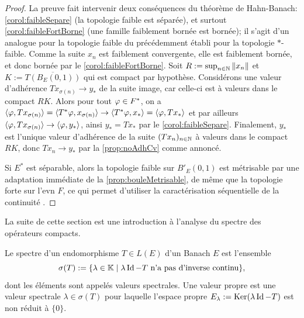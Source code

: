\begin{proof}
	La preuve fait intervenir deux conséquences du théorème de Hahn-Banach: \cref{corol:faibleSepare} (la topologie faible est séparée), et surtout \cref{corol:faibleFortBorne} (une famille faiblement bornée est bornée); 
	il s'agit d'un analogue pour la topologie faible du  précédemment établi pour la topologie $*$-faible.
	Comme la suite $x_n$ est faiblement convergente, elle est faiblement bornée, et donc bornée par le \cref{corol:faibleFortBorne}. %
	Soit $R := \sup_{n \in \mathbb{N}} \|x_n\|$ et $K := \overline {T(B_E(0,1))}$ qui est compact par hypothèse. Considérons une valeur d'adhérence $T x_{\sigma(n)} \to y_*$ de la suite image, car celle-ci est à valeurs dans le compact $R K$. 
	Alors pour tout $\varphi \in F^*$, on a $\langle\varphi, T x_{\sigma(n)}\rangle = \langle T^* \varphi, x_{\sigma(n)}\rangle \to \langle T^* \varphi, x_*\rangle = \langle\varphi, T x_*\rangle$ et par ailleurs $\langle\varphi, T x_{\sigma(n)}\rangle \to \langle \varphi, y_*\rangle$, ainsi $y_* = T x_*$ par le \cref{corol:faibleSepare}.
	Finalement, $y_*$ est l'unique valeur d'adhérence de la suite $(T x_n)_{n \in \mathbb{N}}$ à valeurs dans le compact $R K$, donc $T x_n \to y_*$ par la \cref{prop:noAdhCv} comme annoncé.	
	
	Si $E^*$ est séparable, alors la topologie faible sur $B'_E(0,1)$ est métrisable par une adaptation immédiate de la \cref{prop:bouleMetrisable}, de même que la topologie forte sur l'evn $F$, ce qui permet d'utiliser la caractérisation séquentielle de la continuité .
\end{proof}


La suite de cette section est une introduction à l'analyse du spectre des opérateurs compacts.

\begin{definition}
\label{def:linSpectre}
%
Le spectre d'un endomorphisme $T \in L(E)$ d'un Banach $E$ est l'ensemble 	
\begin{equation*}
	\sigma(T) := \{\lambda \in \mathbb{K} \mid \lambda\operatorname{Id} - T \text{ n'a pas d'inverse continu}\},
\end{equation*}
dont les éléments sont appelés valeurs spectrales. Une valeur propre est une valeur spectrale $\lambda\in \sigma(T)$ pour laquelle l'espace propre $E_\lambda := \operatorname{Ker}(\lambda \operatorname{Id}-T)$ est non réduit à $\{0\}$.
\end{definition}


